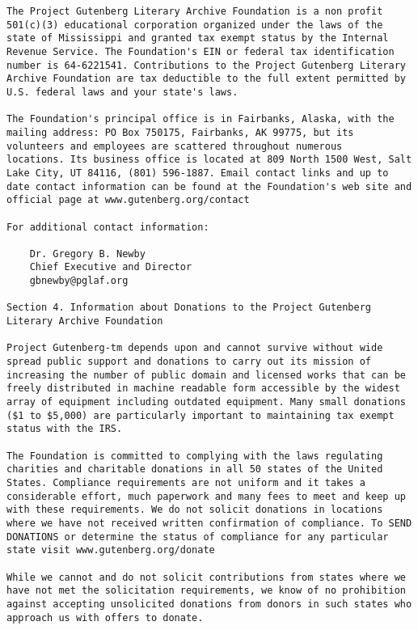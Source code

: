 \documentclass{book}[2021/07/26]
\begin{document}
\begin{mainmatter}
\begin{spacing}{1.3}
\begin{verbatim}
The Project Gutenberg Literary Archive Foundation is a non profit
501(c)(3) educational corporation organized under the laws of the
state of Mississippi and granted tax exempt status by the Internal
Revenue Service. The Foundation's EIN or federal tax identification
number is 64-6221541. Contributions to the Project Gutenberg Literary
Archive Foundation are tax deductible to the full extent permitted by
U.S. federal laws and your state's laws.

The Foundation's principal office is in Fairbanks, Alaska, with the
mailing address: PO Box 750175, Fairbanks, AK 99775, but its
volunteers and employees are scattered throughout numerous
locations. Its business office is located at 809 North 1500 West, Salt
Lake City, UT 84116, (801) 596-1887. Email contact links and up to
date contact information can be found at the Foundation's web site and
official page at www.gutenberg.org/contact

For additional contact information:

    Dr. Gregory B. Newby
    Chief Executive and Director
    gbnewby@pglaf.org

Section 4. Information about Donations to the Project Gutenberg
Literary Archive Foundation

Project Gutenberg-tm depends upon and cannot survive without wide
spread public support and donations to carry out its mission of
increasing the number of public domain and licensed works that can be
freely distributed in machine readable form accessible by the widest
array of equipment including outdated equipment. Many small donations
($1 to $5,000) are particularly important to maintaining tax exempt
status with the IRS.

The Foundation is committed to complying with the laws regulating
charities and charitable donations in all 50 states of the United
States. Compliance requirements are not uniform and it takes a
considerable effort, much paperwork and many fees to meet and keep up
with these requirements. We do not solicit donations in locations
where we have not received written confirmation of compliance. To SEND
DONATIONS or determine the status of compliance for any particular
state visit www.gutenberg.org/donate

While we cannot and do not solicit contributions from states where we
have not met the solicitation requirements, we know of no prohibition
against accepting unsolicited donations from donors in such states who
approach us with offers to donate.


\end{verbatim}
\end{spacing}
\end{mainmatter}
\end{document}
